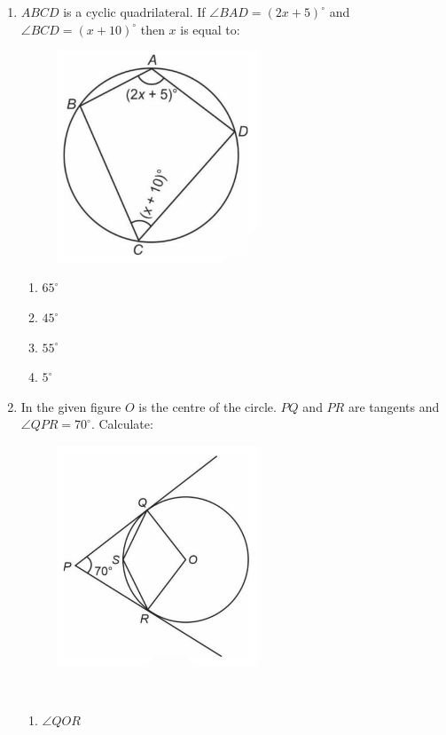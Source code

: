 \documentclass{article}
\begin{document}
\begin{enumerate}
	\item $ABCD$ is a cyclic quadrilateral. If $\angle BAD = (2x + 5)^{\circ}$ and $\angle BCD = (x + 10)^{\circ}$ then $x$ is equal to:
		\begin{figure}[h]
			\centering
			\includegraphics[width=60mm]{figs/img2.jpg}
			\label{figure}
		\end{figure}
		\begin{enumerate}
			\item $65^{\circ}$
			\item $45^{\circ}$
			\item $55^{\circ}$
			\item $5^{\circ}$
		\end{enumerate}
	\item In the given figure $O$ is the centre of the circle. $PQ$ and $PR$ are tangents and $\angle QPR = 70^{\circ}$. Calculate:\\
		\begin{figure}[h]
			\centering
			\includegraphics[width=60mm]{figs/img3.jpg}
			\label{figure}
		\end{figure}\\
		\begin{enumerate}
			\item $\angle QOR$

\end{enumerate}
\end{enumerate}
\end{document}
